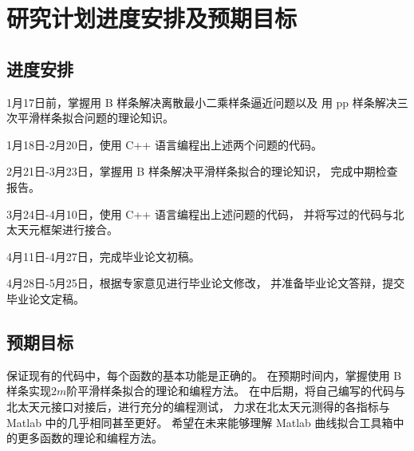 \section{研究计划进度安排及预期目标}

\subsection{进度安排}
1月17日前，掌握用 B 样条解决离散最小二乘样条逼近问题以及
用 pp 样条解决三次平滑样条拟合问题的理论知识。

1月18日-2月20日，使用 C++ 语言编程出上述两个问题的代码。

2月21日-3月23日，掌握用 B 样条解决平滑样条拟合的理论知识，
完成中期检查报告。

3月24日-4月10日，使用 C++ 语言编程出上述问题的代码，
并将写过的代码与北太天元框架进行接合。

4月11日-4月27日，完成毕业论文初稿。

4月28日-5月25日，根据专家意见进行毕业论文修改，
并准备毕业论文答辩，提交毕业论文定稿。
\subsection{预期目标}
保证现有的代码中，每个函数的基本功能是正确的。
在预期时间内，掌握使用 B 样条实现$2m$阶平滑样条拟合的理论和编程方法。
在中后期，将自己编写的代码与北太天元接口对接后，进行充分的编程测试，
力求在北太天元测得的各指标与 Matlab 中的几乎相同甚至更好。
希望在未来能够理解 Matlab 曲线拟合工具箱中的更多函数的理论和编程方法。

